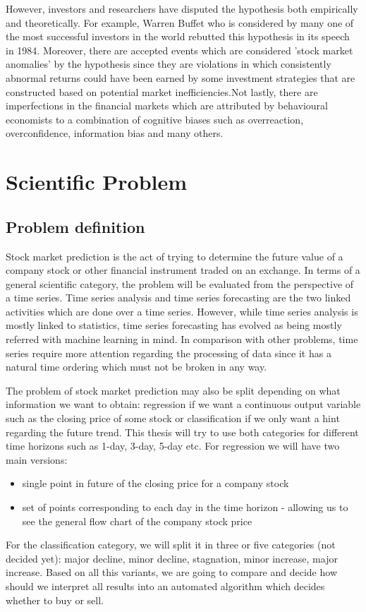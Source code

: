 However, investors and researchers have disputed the hypothesis both empirically and theoretically. For example, Warren Buffet who is considered by many one of the most successful investors in the world rebutted this hypothesis in its speech in 1984.\cite{businessinsiderwarrenbuffet} Moreover, there are accepted events which are considered 'stock market anomalies' by the hypothesis since they are violations in which consistently abnormal returns could have been earned by some investment strategies that are constructed based on potential market inefficiencies.Not lastly, there are imperfections in the financial markets which are attributed by behavioural economists to a combination of cognitive biases such as overreaction, overconfidence, information bias and many others.


\section{Scientific Problem}
\subsection{Problem definition}
Stock market prediction is the act of trying to determine the future value of a company stock or other financial instrument traded on an exchange. In terms of a general scientific category, the problem will be evaluated from the perspective of a time series. Time series analysis and time series forecasting are the two linked activities which are done over a time series. However, while time series analysis is mostly linked to statistics, time series forecasting has evolved as being mostly referred with machine learning in mind. In comparison with other problems, time series require more attention regarding the processing of data since it has a natural time ordering which must not be broken in any way.

The problem of stock market prediction may also be split depending on what information we want to obtain: regression if we want a continuous output variable such as the closing price of some stock or classification if we only want a hint regarding the future trend. This thesis will try to use both categories for different time horizons such as 1-day, 3-day, 5-day etc. For regression we will have two main versions:
\begin{itemize}
    \item single point in future of the closing price for a company stock
    \item set of points corresponding to each day in the time horizon - allowing us to see the general flow chart of the company stock price
\end{itemize}
For the classification category, we will split it in three or five categories (not decided yet): major decline, minor decline, stagnation, minor increase, major increase. Based on all this variants, we are going to compare and decide how should we interpret all results into an automated algorithm which decides whether to buy or sell.

